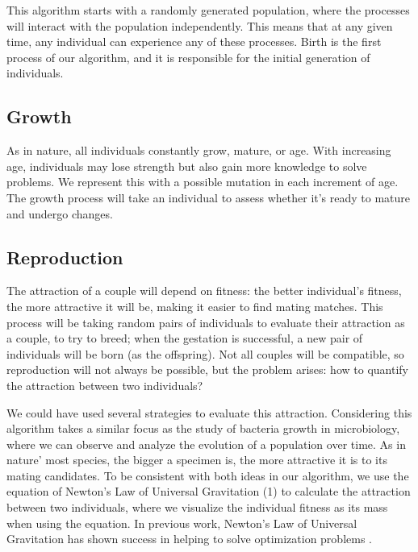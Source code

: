 \documentclass[graybox]{svmult}
\begin{document}
This algorithm starts with a randomly generated population, where the processes
will interact with the population independently. This means that at any given
time, any individual can experience any of these processes. Birth is the first
process of our algorithm, and it is responsible for the initial generation of
individuals.

\subsection{Growth}

As in nature, all individuals constantly grow, mature, or age. With increasing
age, individuals may lose strength but also gain more knowledge to solve
problems. We represent this with a possible mutation in each increment of age.
The growth process will take an individual to assess whether it's ready to
mature and undergo changes. %

\subsection{Reproduction}

The attraction of a couple will depend on fitness: the better individual's
fitness, the more attractive it will be, making it easier to find mating
matches. This process will be taking random pairs of individuals to evaluate
their attraction as a couple, to try to breed; when the gestation is
successful, a new pair of individuals will be born (as the offspring). Not all
couples will be compatible, so reproduction will not always be possible, but
the problem arises: how to quantify the attraction between two individuals?

We could have used several strategies to evaluate this attraction. Considering
this algorithm takes a similar focus as the study of bacteria growth in
microbiology, where we can observe and analyze the evolution of a population
over time. As in nature' most species, the bigger a specimen is, the more
attractive it is to its mating candidates. To be consistent with both ideas in
our algorithm, we use the equation of Newton's Law of Universal Gravitation (1)
to calculate the attraction between two individuals, where we visualize the
individual fitness as its mass when using the equation. In previous work,
Newton's Law of Universal Gravitation has shown success in helping to solve
optimization problems \cite{sanchez2014fuzzy,rashedi2009gsa}.
\end{document}
